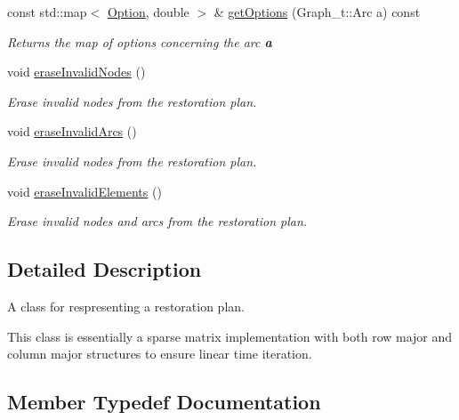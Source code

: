 \begin{DoxyCompactItemize}
const std\+::map$<$ \hyperlink{class_restoration_plan2_aff164a2726831342bf87af5e11df1064}{Option}, double $>$ \& \hyperlink{class_restoration_plan2_a04acf02934f7b06d3540c2bc68de73d0}{get\+Options} (Graph\+\_\+t\+::\+Arc a) const
\begin{DoxyCompactList}\small\item\em Returns the map of options concerning the arc {\bfseries a} \end{DoxyCompactList}\item 
void \hyperlink{class_restoration_plan2_a5258c8409176279c8bab604400722b25}{erase\+Invalid\+Nodes} ()
\begin{DoxyCompactList}\small\item\em Erase invalid nodes from the restoration plan. \end{DoxyCompactList}\item 
void \hyperlink{class_restoration_plan2_a51e5a2f223e0cbd8763f0ff60c8a4599}{erase\+Invalid\+Arcs} ()
\begin{DoxyCompactList}\small\item\em Erase invalid nodes from the restoration plan. \end{DoxyCompactList}\item 
void \hyperlink{class_restoration_plan2_aeb925e92d2141fe96979538f087c277a}{erase\+Invalid\+Elements} ()
\begin{DoxyCompactList}\small\item\em Erase invalid nodes and arcs from the restoration plan. \end{DoxyCompactList}\end{DoxyCompactItemize}


\subsection{Detailed Description}
A class for respresenting a restoration plan. 

This class is essentially a sparse matrix implementation with both row major and column major structures to ensure linear time iteration. 

\subsection{Member Typedef Documentation}
\mbox{\label{class_restoration_plan2_aff164a2726831342bf87af5e11df1064}} 
